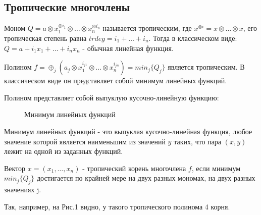 \documentclass[russian]{lecture-notes}
\begin{document}
\subsection{Тропические многочлены}

\begin{Definition}
	Моном $Q=a\otimes x_1^{\otimes i_1}\otimes\ldots\otimes x_n^{\otimes i_n}$ называется тропическим, где $x^{\otimes i}=x\otimes\ldots\otimes x$, его тропическая степень равна $trdeg=i_1+\ldots+i_n$. Тогда в классическом виде: $Q=a+i_1x_1+\ldots+i_nx_n$ - обычная линейная функция.
	\end{Definition}
\begin{Definition}
	Полином $f=\oplus_j(a_j\otimes x_1^{i_{j1}}\otimes\ldots\otimes x_n^{i_{jn}})=min_j\{Q_j\}$ является тропическим. В классическом виде он представляет собой минимум линейных функций.
		\end{Definition}


 Полином представляет собой выпуклую кусочно-линейную функцию:


\begin{figure}[h!]
\caption{Минимум линейных функций}
\end{figure}
\begin{Definition}
	Минимум линейных функций - это выпуклая кусочно-линейная функция, любое значение которой является наименьшим из значений $y$ таких, что пара $(x,y)$ лежит на одной из заданных функций.\\
	\end{Definition}
\begin{Definition}
Вектор $x=(x_1,\ldots, x_n)$ - тропический корень многочлена $f$, если минимум $min_j\{Q_j\}$ достигается по крайней мере на двух разных мономах, на двух разных значениях j.
\end{Definition}
Так, например, на Рис.1 видно, у такого тропического полинома 4 корня.
\end{document}
